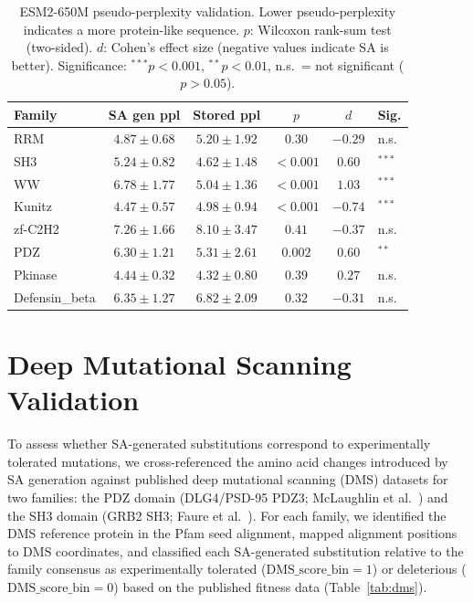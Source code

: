 \begin{table}[ht]
\centering
\caption{ESM2-650M pseudo-perplexity validation. Lower pseudo-perplexity indicates a more protein-like sequence. $p$: Wilcoxon rank-sum test (two-sided). $d$: Cohen's effect size (negative values indicate SA is better). Significance: $^{***}p < 0.001$, $^{**}p < 0.01$, n.s.\ = not significant ($p > 0.05$).}
\label{tab:esm2}
\small
\begin{tabular}{@{}lccccl@{}}
\toprule
Family & SA gen ppl & Stored ppl & $p$ & $d$ & Sig. \\
\midrule
RRM            & $4.87 \pm 0.68$ & $5.20 \pm 1.92$ & $0.30$    & $-0.29$ & n.s. \\
SH3            & $5.24 \pm 0.82$ & $4.62 \pm 1.48$ & $<0.001$  & $0.60$  & $^{***}$ \\
WW             & $6.78 \pm 1.77$ & $5.04 \pm 1.36$ & $<0.001$  & $1.03$  & $^{***}$ \\
Kunitz         & $4.47 \pm 0.57$ & $4.98 \pm 0.94$ & $<0.001$  & $-0.74$ & $^{***}$ \\
zf-C2H2        & $7.26 \pm 1.66$ & $8.10 \pm 3.47$ & $0.41$    & $-0.37$ & n.s. \\
PDZ            & $6.30 \pm 1.21$ & $5.31 \pm 2.61$ & $0.002$   & $0.60$  & $^{**}$ \\
Pkinase        & $4.44 \pm 0.32$ & $4.32 \pm 0.80$ & $0.39$    & $0.27$  & n.s. \\
Defensin\_beta & $6.35 \pm 1.27$ & $6.82 \pm 2.09$ & $0.32$    & $-0.31$ & n.s. \\
\bottomrule
\end{tabular}
\end{table}

\section{Deep Mutational Scanning Validation}\label{si:dms}

To assess whether SA-generated substitutions correspond to experimentally tolerated mutations, we cross-referenced the amino acid changes introduced by SA generation against published deep mutational scanning (DMS) datasets for two families: the PDZ domain (DLG4/PSD-95 PDZ3; McLaughlin et al.~\cite{mclaughlinSpatialArchitecture2012}) and the SH3 domain (GRB2 SH3; Faure et al.~\cite{faureDoubleDMS2022}). For each family, we identified the DMS reference protein in the Pfam seed alignment, mapped alignment positions to DMS coordinates, and classified each SA-generated substitution relative to the family consensus as experimentally tolerated ($\mathrm{DMS\_score\_bin}{=}1$) or deleterious ($\mathrm{DMS\_score\_bin}{=}0$) based on the published fitness data (Table~\ref{tab:dms}).

